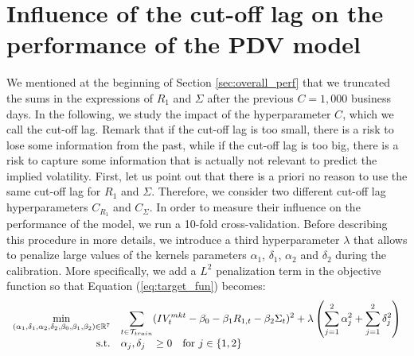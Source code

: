 
\section{Influence of the cut-off lag on the performance of the PDV model}\label{sec:influence_cutoff}
We mentioned at the beginning of Section \ref{sec:overall_perf} that we truncated the sums in the expressions of $R_1$ and $\Sigma$ after the previous $C=1,000$ business days. In the following, we study the impact of the hyperparameter $C$, which we call the cut-off lag. Remark that if the cut-off lag is too small, there is a risk to lose some information from the past, while if the cut-off lag is too big, there is a risk to capture some information that is actually not relevant to predict the implied volatility. First, let us point out that there is a priori no reason to use the same cut-off lag for $R_1$ and $\Sigma$. Therefore, we consider two different cut-off lag hyperparameters $C_{R_1}$ and $C_{\Sigma}$. In order to measure their influence on the performance of the model, we run a 10-fold cross-validation. Before describing this procedure in more details, we introduce a third hyperparameter $\lambda$ that allows to penalize large values of the kernels parameters $\alpha_1$, $\delta_1$, $\alpha_2$ and $\delta_2$ during the calibration. More specifically, we add a $L^2$ penalization term in the objective function so that Equation (\ref{eq:target_fun}) becomes:
\begin{equation}
    \begin{array}{rrcll}
    \displaystyle\min_{(\alpha_1,\delta_1,\alpha_2,\delta_2,\beta_0,\beta_1,\beta_2) \in \mathbb{R}^7} & \multicolumn{4}{c}{\displaystyle\sum_{t\in \mathcal{T}_{train}} (IV^{mkt}_t - \beta_0-\beta_1R_{1,t}-\beta_2\Sigma_t)^2+\lambda \left(\displaystyle\sum_{j=1}^2 \alpha_j^2 + \displaystyle\sum_{j=1}^2 \delta_j^2 \right) } \\
   \text{s.t.} & \alpha_j, \delta_j &\ge 0 & \text{for } j \in \{1,2\} \\
    \end{array}
\end{equation}  
